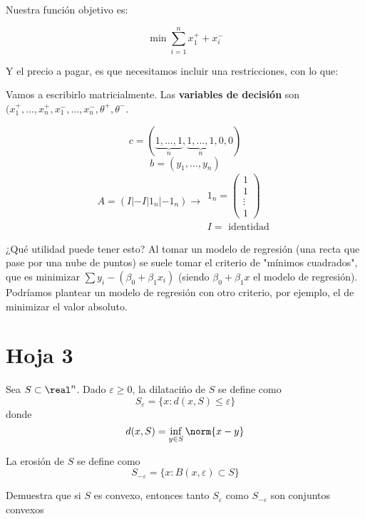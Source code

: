\begin{problem}[9]
Nuestra función objetivo es:

\[\min \sum_{i=1}^n x_1^+ + x_i^-\]

Y el precio a pagar, es que necesitamos incluir una restricciones, con lo que:


\begin{ioprob}
\goal{\[\min \sum_{i=1}^n x_1^+ + x_i^-\]}
\end{ioprob}


Vamos a escribirlo matricialmente.
Las \textbf{variables de decisión} son $(x_1^+,...,x_n^+,x_1^-,...,x_n^-,\theta^+,\theta^-$. 

\[c = (\underbrace{1,...,1}_{n},\underbrace{1,...,1}_{n},0,0)\]
\[b = (y_1,...,y_n) \]
\[A = \left( I | -I | 1_n | -1_n\right)\to \begin{array}{c}1_n = \begin{pmatrix}1\\1\\\vdots\\1\end{pmatrix}\\ I = \text{ identidad} \end{array}\]




\obs{}
¿Qué utilidad puede tener esto?
Al tomar un modelo de regresión (una recta que pase por una nube de puntos) se suele tomar el criterio de "mínimos cuadrados", que es minimizar $\sum y_i-(β_0+β_1x_i)$ (siendo $β_0+β_1x$ el modelo de regresión). 
Podríamos plantear un modelo de regresión con otro criterio, por ejemplo, el de minimizar el valor absoluto.




\end{problem}



\section{Hoja 3}
\begin{problem}[1]
Sea $S\subset \real^n$. Dado $ε\geq 0$, la dilatacińo de $S$ se define como \[S_ε = \{x:d(x,S)\leq ε\}\] donde \[d(x,S) = \inf_{y\in S}{\norm{x-y}}\]

La erosión de $S$ se define como 
\[S_{-ε} = \{x:B(x,ε) \subset S \} \]

Demuestra que si $S$ es convexo, entonces tanto $S_{ε}$ como $S_{-ε}$ son conjuntos convexos

\solution
{}

\end{problem}


